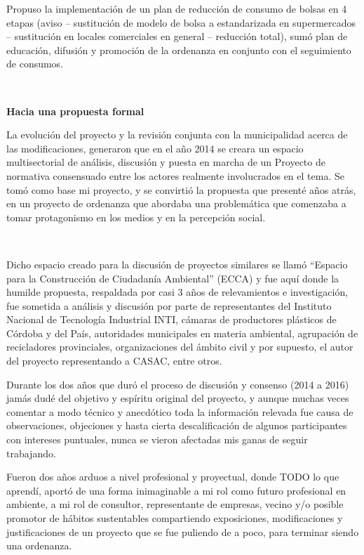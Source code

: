 \begin{fullwidth}
Propuso la implementación de un plan de reducción de consumo de bolsas
en 4 etapas (aviso -- sustitución de modelo de bolsa a estandarizada en
supermercados -- sustitución en locales comerciales en general --
reducción total), sumó plan de educación, difusión y promoción de la
ordenanza en conjunto con el seguimiento de consumos.

~

\textbf{Hacia una propuesta formal}

La evolución del proyecto y la revisión conjunta con la municipalidad
acerca de las modificaciones, generaron que en el año 2014 se creara un
espacio multisectorial de análisis, discusión y puesta en marcha de un
Proyecto de normativa consensuado entre los actores realmente
involucrados en el tema. Se tomó como base mi proyecto, y se convirtió
la propuesta que presenté años atrás, en un proyecto de ordenanza que
abordaba una problemática que comenzaba a tomar protagonismo en los
medios y en la percepción social.

~

Dicho espacio creado para la discusión de proyectos similares se llamó
``Espacio para la Construcción de Ciudadanía Ambiental'' (ECCA) y fue
aquí donde la humilde propuesta, respaldada por casi 3 años de
relevamientos e investigación, fue sometida a análisis y discusión por
parte de representantes del Instituto Nacional de Tecnología Industrial
INTI, cámaras de productores plásticos de Córdoba y del País,
autoridades municipales en materia ambiental, agrupación de recicladores
provinciales, organizaciones del ámbito civil y por supuesto, el autor
del proyecto representando a CASAC, entre otros.

Durante los dos años que duró el proceso de discusión y consenso (2014 a
2016) jamás dudé del objetivo y espíritu original del proyecto, y aunque
muchas veces comentar a modo técnico y anecdótico toda la información
relevada fue causa de observaciones, objeciones y hasta cierta
descalificación de algunos participantes con intereses puntuales, nunca
se vieron afectadas mis ganas de seguir trabajando.

Fueron dos años arduos a nivel profesional y proyectual, donde TODO lo
que aprendí, aportó de una forma inimaginable a mi rol como futuro
profesional en ambiente, a mi rol de consultor, representante de
empresas, vecino y/o posible promotor de hábitos sustentables
compartiendo exposiciones, modificaciones y justificaciones de un
proyecto que se fue puliendo de a poco, para terminar siendo una
ordenanza.


\end{fullwidth}
